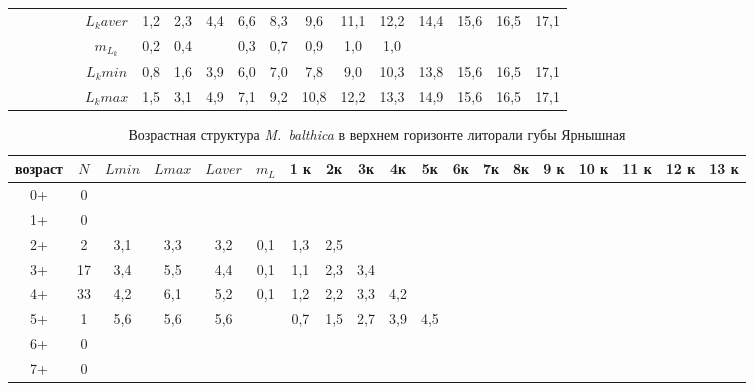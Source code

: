 \begin{landscape}
\begin{table}[h]
\begin{tabular}{|c|c|cc|cc|cccccccccccc|}
        &   &       &       &         & $L_k aver$ & 1,2 & 2,3 & 4,4 & 6,6 & 8,3 & 9,6  & 11,1 & 12,2 & 14,4 & 15,6 & 16,5 & 17,1 \\
        &   &       &       &         & $m_{L_k}$  & 0,2 & 0,4 &     & 0,3 & 0,7 & 0,9  & 1,0  & 1,0  &      &      &      &      \\
        &   &       &       &         & $L_k min$  & 0,8 & 1,6 & 3,9 & 6,0 & 7,0 & 7,8  & 9,0  & 10,3 & 13,8 & 15,6 & 16,5 & 17,1 \\
        &   &       &       &         & $L_k max$  & 1,5 & 3,1 & 4,9 & 7,1 & 9,2 & 10,8 & 12,2 & 13,3 & 14,9 & 15,6 & 16,5 & 17,1 \\ \hline
\end{tabular}
\end{table}

\begin{table}[h]
\caption{Возрастная структура {\it M.~balthica} в верхнем горизонте литорали губы Ярнышная}
\label{tab:Yarnyshnaya_vgl_growth_matrix}
\begin{tabular}{|c|c|cc|cc|ccccccccccccc|}
    \hline
возраст & $N$  & $L min$ & $L max$ & $L aver$ & $m_L$   & 1 к & 2к  & 3к  & 4к  & 5к  & 6к   & 7к   & 8к   & 9 к  & 10 к & 11 к & 12 к & 13 к \\ \hline
0+      & 0  &       &       &         &         &     &     &     &     &     &      &      &      &      &      &      &      &      \\
1+      & 0  &       &       &         &         &     &     &     &     &     &      &      &      &      &      &      &      &      \\
2+      & 2  & 3,1   & 3,3   & 3,2     & 0,1     & 1,3 & 2,5 &     &     &     &      &      &      &      &      &      &      &      \\
3+      & 17 & 3,4   & 5,5   & 4,4     & 0,1     & 1,1 & 2,3 & 3,4 &     &     &      &      &      &      &      &      &      &      \\
4+      & 33 & 4,2   & 6,1   & 5,2     & 0,1     & 1,2 & 2,2 & 3,3 & 4,2 &     &      &      &      &      &      &      &      &      \\
5+      & 1  & 5,6   & 5,6   & 5,6     &         & 0,7 & 1,5 & 2,7 & 3,9 & 4,5 &      &      &      &      &      &      &      &      \\
6+      & 0  &       &       &         &         &     &     &     &     &     &      &      &      &      &      &      &      &      \\
7+      & 0  &       &       &         &         &     &     &     &     &     &      &      &      &      &      &      &      &      \\

\end{tabular}
\end{table}
\end{landscape}
